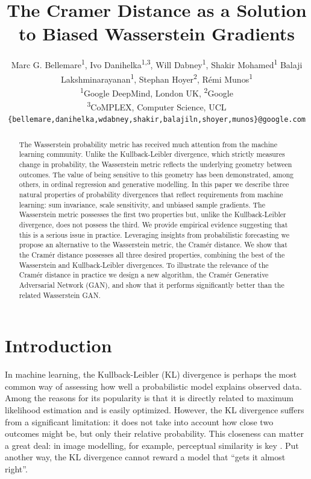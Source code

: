 \documentclass{article}
\title{The Cramer Distance as a Solution to Biased Wasserstein Gradients}
\author{Marc G. Bellemare\textsuperscript{1},
Ivo Danihelka\textsuperscript{1,3},
Will Dabney\textsuperscript{1},
Shakir Mohamed\textsuperscript{1} \AND
Balaji Lakshminarayanan\textsuperscript{1},
Stephan Hoyer\textsuperscript{2},
R\'emi Munos\textsuperscript{1}\\
\textsuperscript{1}Google DeepMind, London UK,
\textsuperscript{2}Google\\
\textsuperscript{3}CoMPLEX, Computer Science, UCL\\
%
%
\texttt{\{bellemare,danihelka,wdabney,shakir,balajiln,shoyer,munos\}@google.com} \\
}
\begin{document}
\maketitle

\begin{abstract}
The Wasserstein probability metric has received much attention from the machine learning community. Unlike the Kullback-Leibler divergence, which strictly measures change in probability, the Wasserstein metric reflects the underlying geometry between outcomes. 
The value of being sensitive to this geometry has been demonstrated, among others, in ordinal regression and generative modelling.
%
In this paper we describe three natural properties of probability divergences that reflect requirements from machine learning: sum invariance, scale sensitivity, and unbiased sample gradients. The Wasserstein metric possesses the first two properties but, unlike the Kullback-Leibler divergence, does not possess the third. We provide empirical evidence 
suggesting that this is a serious issue in practice. Leveraging insights from probabilistic forecasting we propose an alternative to the Wasserstein metric, the Cram\'er distance. We show that the Cram\'er distance possesses all three desired properties, combining the best of the Wasserstein and Kullback-Leibler divergences. To illustrate the relevance of the Cram\'er distance in practice we design a new algorithm, the Cram{\'e}r Generative Adversarial Network (GAN), and show that it performs significantly better than the related Wasserstein GAN.
\end{abstract}

\section{Introduction}

In machine learning, the Kullback-Leibler (KL) divergence is perhaps the most common way of assessing how well a probabilistic model explains observed data. Among the reasons for its popularity is that it is directly related to maximum likelihood estimation and is easily optimized. However, the KL divergence suffers from a significant limitation: it does not take into account how close two outcomes might be, but only their relative probability. This closeness can matter a great deal: in image modelling, for example, perceptual similarity is key \citep{rubner2000earth,gao2016distributionally}. Put another way, the KL divergence cannot reward a model that ``gets it almost right''.
\end{document}
